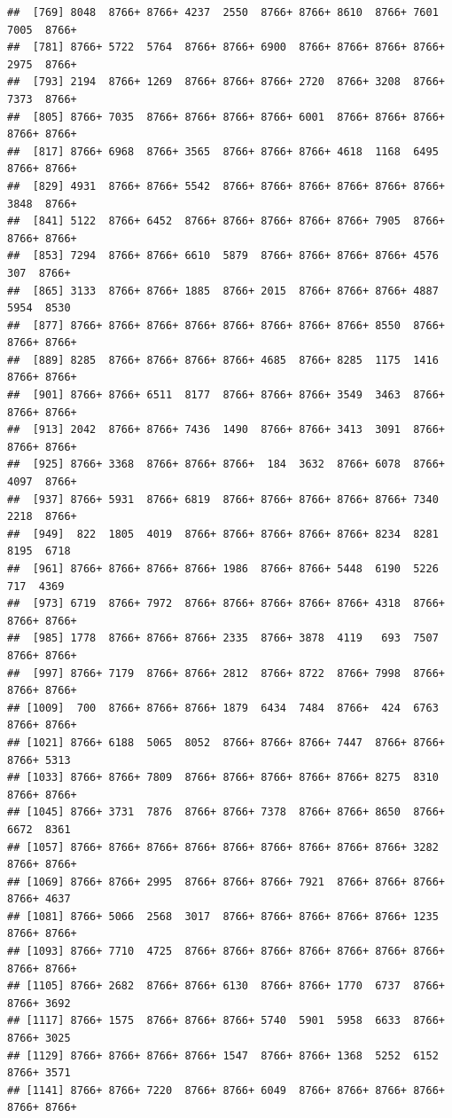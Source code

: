 \documentclass[
]{book}
\begin{document}
\begin{verbatim}
##  [769] 8048  8766+ 8766+ 4237  2550  8766+ 8766+ 8610  8766+ 7601  7005  8766+
##  [781] 8766+ 5722  5764  8766+ 8766+ 6900  8766+ 8766+ 8766+ 8766+ 2975  8766+
##  [793] 2194  8766+ 1269  8766+ 8766+ 8766+ 2720  8766+ 3208  8766+ 7373  8766+
##  [805] 8766+ 7035  8766+ 8766+ 8766+ 8766+ 6001  8766+ 8766+ 8766+ 8766+ 8766+
##  [817] 8766+ 6968  8766+ 3565  8766+ 8766+ 8766+ 4618  1168  6495  8766+ 8766+
##  [829] 4931  8766+ 8766+ 5542  8766+ 8766+ 8766+ 8766+ 8766+ 8766+ 3848  8766+
##  [841] 5122  8766+ 6452  8766+ 8766+ 8766+ 8766+ 8766+ 7905  8766+ 8766+ 8766+
##  [853] 7294  8766+ 8766+ 6610  5879  8766+ 8766+ 8766+ 8766+ 4576   307  8766+
##  [865] 3133  8766+ 8766+ 1885  8766+ 2015  8766+ 8766+ 8766+ 4887  5954  8530 
##  [877] 8766+ 8766+ 8766+ 8766+ 8766+ 8766+ 8766+ 8766+ 8550  8766+ 8766+ 8766+
##  [889] 8285  8766+ 8766+ 8766+ 8766+ 4685  8766+ 8285  1175  1416  8766+ 8766+
##  [901] 8766+ 8766+ 6511  8177  8766+ 8766+ 8766+ 3549  3463  8766+ 8766+ 8766+
##  [913] 2042  8766+ 8766+ 7436  1490  8766+ 8766+ 3413  3091  8766+ 8766+ 8766+
##  [925] 8766+ 3368  8766+ 8766+ 8766+  184  3632  8766+ 6078  8766+ 4097  8766+
##  [937] 8766+ 5931  8766+ 6819  8766+ 8766+ 8766+ 8766+ 8766+ 7340  2218  8766+
##  [949]  822  1805  4019  8766+ 8766+ 8766+ 8766+ 8766+ 8234  8281  8195  6718 
##  [961] 8766+ 8766+ 8766+ 8766+ 1986  8766+ 8766+ 5448  6190  5226   717  4369 
##  [973] 6719  8766+ 7972  8766+ 8766+ 8766+ 8766+ 8766+ 4318  8766+ 8766+ 8766+
##  [985] 1778  8766+ 8766+ 8766+ 2335  8766+ 3878  4119   693  7507  8766+ 8766+
##  [997] 8766+ 7179  8766+ 8766+ 2812  8766+ 8722  8766+ 7998  8766+ 8766+ 8766+
## [1009]  700  8766+ 8766+ 8766+ 1879  6434  7484  8766+  424  6763  8766+ 8766+
## [1021] 8766+ 6188  5065  8052  8766+ 8766+ 8766+ 7447  8766+ 8766+ 8766+ 5313 
## [1033] 8766+ 8766+ 7809  8766+ 8766+ 8766+ 8766+ 8766+ 8275  8310  8766+ 8766+
## [1045] 8766+ 3731  7876  8766+ 8766+ 7378  8766+ 8766+ 8650  8766+ 6672  8361 
## [1057] 8766+ 8766+ 8766+ 8766+ 8766+ 8766+ 8766+ 8766+ 8766+ 3282  8766+ 8766+
## [1069] 8766+ 8766+ 2995  8766+ 8766+ 8766+ 7921  8766+ 8766+ 8766+ 8766+ 4637 
## [1081] 8766+ 5066  2568  3017  8766+ 8766+ 8766+ 8766+ 8766+ 1235  8766+ 8766+
## [1093] 8766+ 7710  4725  8766+ 8766+ 8766+ 8766+ 8766+ 8766+ 8766+ 8766+ 8766+
## [1105] 8766+ 2682  8766+ 8766+ 6130  8766+ 8766+ 1770  6737  8766+ 8766+ 3692 
## [1117] 8766+ 1575  8766+ 8766+ 8766+ 5740  5901  5958  6633  8766+ 8766+ 3025 
## [1129] 8766+ 8766+ 8766+ 8766+ 1547  8766+ 8766+ 1368  5252  6152  8766+ 3571 
## [1141] 8766+ 8766+ 7220  8766+ 8766+ 6049  8766+ 8766+ 8766+ 8766+ 8766+ 8766+

\end{verbatim}
\end{document}
